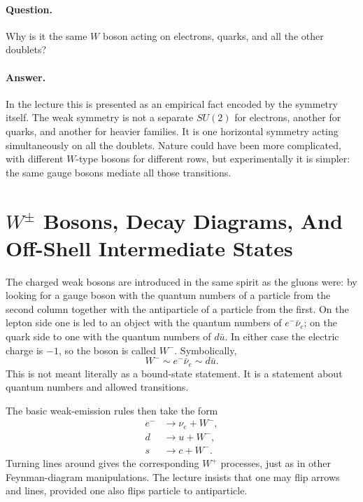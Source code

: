 \paragraph{Question.} Why is it the same \(W\) boson acting on electrons, quarks, and all the other doublets?

\paragraph{Answer.} In the lecture this is presented as an empirical fact encoded by the symmetry itself. The weak symmetry is not a separate \(SU(2)\) for electrons, another for quarks, and another for heavier families. It is one horizontal symmetry acting simultaneously on all the doublets. Nature could have been more complicated, with different \(W\)-type bosons for different rows, but experimentally it is simpler: the same gauge bosons mediate all those transitions.

\section{\(W^\pm\) Bosons, Decay Diagrams, And Off-Shell Intermediate States}

The charged weak bosons are introduced in the same spirit as the gluons were: by looking for a gauge boson with the quantum numbers of a particle from the second column together with the antiparticle of a particle from the first. On the lepton side one is led to an object with the quantum numbers of \(e^- \bar\nu_e\); on the quark side to one with the quantum numbers of \(d\bar u\). In either case the electric charge is \(-1\), so the boson is called \(W^-\). Symbolically,
\begin{equation}
W^- \sim e^- \bar\nu_e \sim d\bar u.
\end{equation}
This is not meant literally as a bound-state statement. It is a statement about quantum numbers and allowed transitions.

The basic weak-emission rules then take the form
\begin{align}
e^- &\to \nu_e + W^-,\\
d &\to u + W^-,\\
s &\to c + W^-.
\end{align}
Turning lines around gives the corresponding \(W^+\) processes, just as in other Feynman-diagram manipulations. The lecture insists that one may flip arrows and lines, provided one also flips particle to antiparticle.

